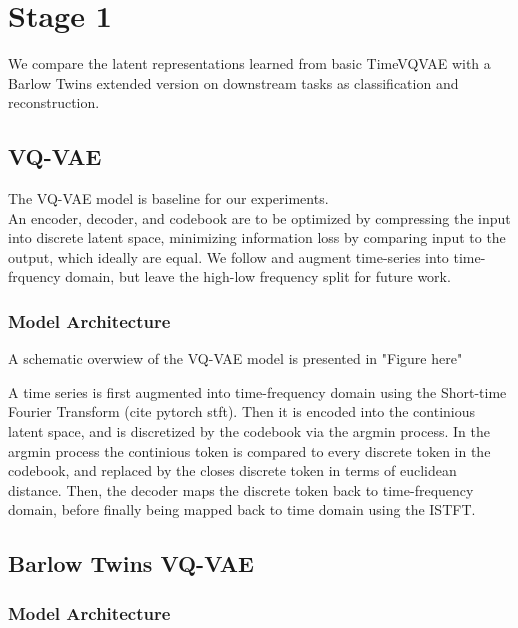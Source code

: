 \documentclass[../../thesis.tex]{subfiles}
\begin{document}

\section{Stage 1}
We compare the latent representations learned from basic TimeVQVAE with a Barlow Twins extended version on downstream tasks as classification and reconstruction.

\subsection{VQ-VAE}
The VQ-VAE model is baseline for our experiments.\\

An encoder, decoder, and codebook are to be optimized by compressing the input into discrete latent space, minimizing information loss by comparing input to the output, which ideally are equal. We follow \cite{TimeVQVAE} and augment time-series into time-frquency domain, but leave the high-low frequency split for future work. \\

\subsubsection{Model Architecture}
A schematic overwiew of the VQ-VAE model is presented in "Figure here"

A time series is first augmented into time-frequency domain using the Short-time Fourier Transform (cite pytorch stft). Then it is encoded into the continious latent space, and is discretized by the codebook via the argmin process. In the argmin process the continious token is compared to every discrete token in the codebook, and replaced by the closes discrete token in terms of euclidean distance. Then, the decoder maps the discrete token back to time-frequency domain, before finally being mapped back to time domain using the ISTFT.



\subsection{Barlow Twins VQ-VAE}
\subsubsection{Model Architecture}
\end{document}
